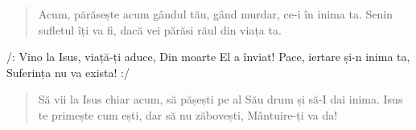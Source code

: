 
\begin{verse}
	Acum, părăsește acum
	gândul tău, gând murdar,
	ce-i în inima ta.
	Senin sufletul îți va fi,
	dacă vei părăsi răul din viața ta.
\end{verse}

\begin{chorus}
	/: Vino la Isus, viață-ți aduce,
	Din moarte El a înviat!
	Pace, iertare și-n inima ta,
	Suferința nu va exista! :/
\end{chorus}

\begin{verse}
	Să vii la Isus chiar acum,
	să pășești pe al Său drum
	și să-I dai inima.
	Isus te primește cum ești,
	dar să nu zăbovești,
	Mântuire-ți va da!
\end{verse}

\endsong